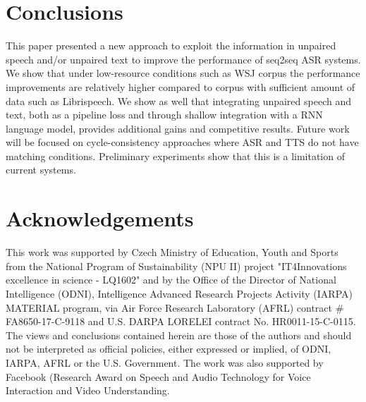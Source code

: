 \documentclass[a4paper]{article}
\begin{document}
\section{Conclusions}
This paper presented a new approach to exploit the information in unpaired speech and/or unpaired text to improve the performance of seq2seq ASR systems. We show that under low-resource conditions such as WSJ corpus the performance improvements are relatively higher compared to corpus with sufficient amount of data such as Librispeech. We show as well that integrating unpaired speech and text, both as a pipeline loss and through shallow integration with a RNN language model, provides additional gains and competitive results. Future work will be focused on cycle-consistency approaches where ASR and TTS do not have matching conditions. Preliminary experiments show that this is a limitation of current systems.


\section{Acknowledgements}
This work was supported by Czech Ministry of Education, Youth and Sports from the National Program of Sustainability (NPU II) project "IT4Innovations excellence in science - LQ1602" and by the Office of the Director of National Intelligence (ODNI), Intelligence Advanced Research Projects Activity (IARPA) MATERIAL program, via Air Force Research Laboratory (AFRL) contract \# FA8650-17-C-9118 and U.S. DARPA LORELEI contract No. HR0011-15-C-0115. The views and conclusions contained herein are those of the authors and should not be interpreted as official policies, either expressed or implied, of ODNI, IARPA, AFRL or the U.S. Government. The work was also supported by Facebook (Research Award on Speech and Audio Technology for Voice Interaction and Video Understanding.



{}
\end{document}
